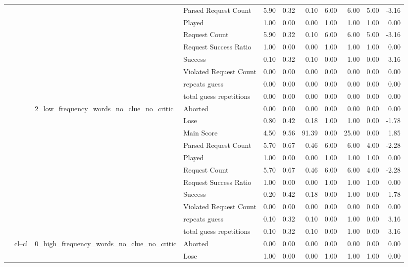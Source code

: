 \begin{tabular}{llllrrrrrrr}
 &  &  & Parsed Request Count & 5.90 & 0.32 & 0.10 & 6.00 & 6.00 & 5.00 & -3.16 \\
 &  &  & Played & 1.00 & 0.00 & 0.00 & 1.00 & 1.00 & 1.00 & 0.00 \\
 &  &  & Request Count & 5.90 & 0.32 & 0.10 & 6.00 & 6.00 & 5.00 & -3.16 \\
 &  &  & Request Success Ratio & 1.00 & 0.00 & 0.00 & 1.00 & 1.00 & 1.00 & 0.00 \\
 &  &  & Success & 0.10 & 0.32 & 0.10 & 0.00 & 1.00 & 0.00 & 3.16 \\
 &  &  & Violated Request Count & 0.00 & 0.00 & 0.00 & 0.00 & 0.00 & 0.00 & 0.00 \\
 &  &  & repeats guess & 0.00 & 0.00 & 0.00 & 0.00 & 0.00 & 0.00 & 0.00 \\
 &  &  & total guess repetitions & 0.00 & 0.00 & 0.00 & 0.00 & 0.00 & 0.00 & 0.00 \\
\cline{3-11}
 &  & \multirow[t]{11}{*}{2_low_frequency_words_no_clue_no_critic} & Aborted & 0.00 & 0.00 & 0.00 & 0.00 & 0.00 & 0.00 & 0.00 \\
 &  &  & Lose & 0.80 & 0.42 & 0.18 & 1.00 & 1.00 & 0.00 & -1.78 \\
 &  &  & Main Score & 4.50 & 9.56 & 91.39 & 0.00 & 25.00 & 0.00 & 1.85 \\
 &  &  & Parsed Request Count & 5.70 & 0.67 & 0.46 & 6.00 & 6.00 & 4.00 & -2.28 \\
 &  &  & Played & 1.00 & 0.00 & 0.00 & 1.00 & 1.00 & 1.00 & 0.00 \\
 &  &  & Request Count & 5.70 & 0.67 & 0.46 & 6.00 & 6.00 & 4.00 & -2.28 \\
 &  &  & Request Success Ratio & 1.00 & 0.00 & 0.00 & 1.00 & 1.00 & 1.00 & 0.00 \\
 &  &  & Success & 0.20 & 0.42 & 0.18 & 0.00 & 1.00 & 0.00 & 1.78 \\
 &  &  & Violated Request Count & 0.00 & 0.00 & 0.00 & 0.00 & 0.00 & 0.00 & 0.00 \\
 &  &  & repeats guess & 0.10 & 0.32 & 0.10 & 0.00 & 1.00 & 0.00 & 3.16 \\
 &  &  & total guess repetitions & 0.10 & 0.32 & 0.10 & 0.00 & 1.00 & 0.00 & 3.16 \\
\cline{2-11} \cline{3-11}
 & \multirow[t]{33}{*}{cl--cl} & \multirow[t]{11}{*}{0_high_frequency_words_no_clue_no_critic} & Aborted & 0.00 & 0.00 & 0.00 & 0.00 & 0.00 & 0.00 & 0.00 \\
 &  &  & Lose & 1.00 & 0.00 & 0.00 & 1.00 & 1.00 & 1.00 & 0.00 \\

\end{tabular}
